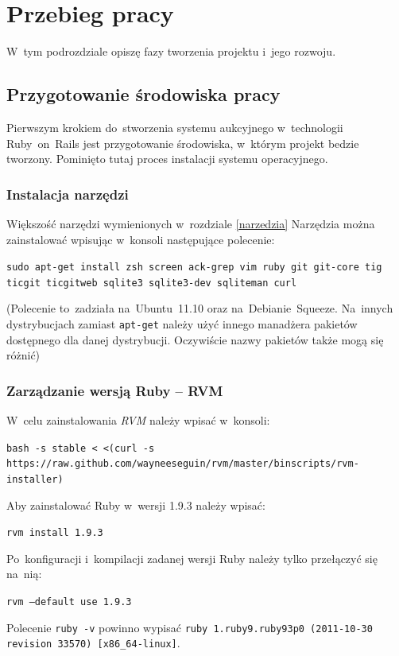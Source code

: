 \section{Przebieg pracy}

W~tym podrozdziale opiszę fazy tworzenia projektu i~jego rozwoju.

\subsection{Przygotowanie środowiska pracy}

Pierwszym krokiem do~stworzenia systemu aukcyjnego w~technologii Ruby~on~Rails jest przygotowanie środowiska, w~którym projekt bedzie tworzony. Pominięto tutaj proces instalacji systemu operacyjnego.

\subsubsection{Instalacja narzędzi}

Większość narzędzi wymienionych w~rozdziale \ref{narzedzia} Narzędzia można zainstalować wpisując w~konsoli następujące polecenie:


\texttt{sudo apt-get install zsh screen ack-grep vim ruby git git-core tig ticgit ticgitweb sqlite3 sqlite3-dev sqliteman curl}


(Polecenie to~zadziała na~Ubuntu~11.10 oraz na~Debianie~Squeeze. Na~innych dystrybucjach zamiast \texttt{apt-get} należy użyć innego manadżera pakietów dostępnego dla danej dystrybucji. Oczywiście nazwy pakietów także mogą się różnić)

\subsubsection{Zarządzanie wersją Ruby -- RVM}

W~celu zainstalowania \textit{RVM} należy wpisać w~konsoli:


\texttt{bash -s stable < <(curl -s https://raw.github.com/wayneeseguin/rvm/master/binscripts/rvm-installer)}


Aby zainstalować Ruby w~wersji 1.9.3 należy wpisać:


\texttt{rvm install 1.9.3}


Po~konfiguracji i~kompilacji zadanej wersji Ruby należy tylko przełączyć się na~nią:


\texttt{rvm --default use 1.9.3}


Polecenie \texttt{ruby -v} powinno wypisać \texttt{ruby 1.ruby9.ruby93p0 (2011-10-30 revision 33570) [x86\_64-linux]}.


